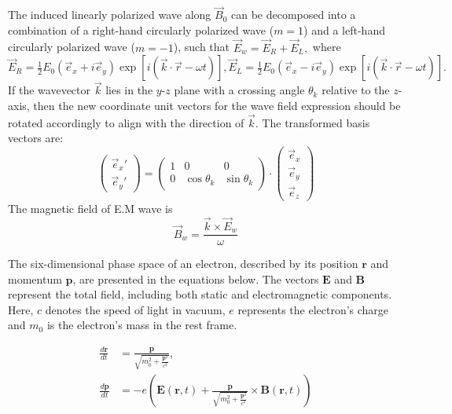 \documentclass{cpbtex3}
\begin{document}
The induced linearly polarized wave along \( \vec{B}_0 \) can be decomposed into a combination of a right-hand circularly polarized wave (\( m = 1 \)) and a left-hand circularly polarized wave (\( m = -1 \)), such that
\(
\vec{E}_w = \vec{E}_R + \vec{E}_L,
\)
where
\(
\vec{E}_R = \frac{1}{2} E_0 (\vec{e}_x + i\vec{e}_y) \exp[i(\vec{k} \cdot \vec{r} - \omega t)],
\vec{E}_L = \frac{1}{2} E_0 (\vec{e}_x - i\vec{e}_y) \exp[i(\vec{k} \cdot \vec{r} - \omega t)].
\)
If the wavevector \( \vec{k} \) lies in the \( y \)-\( z \) plane with a crossing angle \( \theta_k \) relative to the \( z \)-axis, then the new coordinate unit vectors for the wave field expression should be rotated accordingly to align with the direction of \( \vec{k} \). The transformed basis vectors are:
\begin{equation}
\begin{pmatrix}
\vec{e}_x' \\
\vec{e}_y'
\end{pmatrix}
=
\begin{pmatrix}
1 & 0 & 0 \\
0 & \cos\theta_k & \sin\theta_k
\end{pmatrix}
\cdot
\begin{pmatrix}
\vec{e}_x \\
\vec{e}_y \\
\vec{e}_z
\end{pmatrix}
\end{equation}
The magnetic field of E.M wave is
\begin{equation}
\vec{B}_w = \frac{\vec{k} \times \vec{E}_w}{\omega}
\end{equation}

The six-dimensional phase space of an electron, described by its position $\bm{r}$ and momentum $\bm{p}$, are presented in the equations below. The vectors $\bm{E}$ and $\bm{B}$ represent the total field, including both static and electromagnetic components. Here, $c$ denotes the speed of light in vacuum, $e$ represents the electron’s charge and $m_0$ is the electron’s mass in the rest frame.

\begin{equation}
\begin{aligned}
\frac{d\bm{r}}{dt} &= \frac{\bm{p}}{\sqrt{m_0^2 + \frac{\bm{p}^2}{c^2}}}, \\
\frac{d\bm{p}}{dt} &= -e \left( \bm{E}(\bm{r}, t) + \frac{\bm{p}}{\sqrt{m_0^2 + \frac{\bm{p}^2}{c^2}}} \times \bm{B}(\bm{r}, t) \right)
\end{aligned}
\end{equation}
\end{document}
